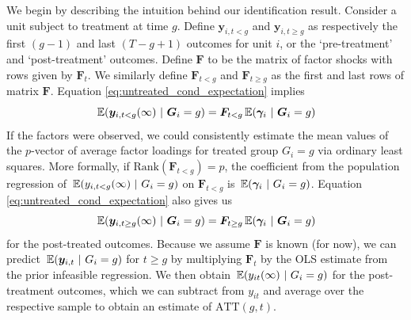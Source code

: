 \documentclass[12pt]{article}
\begin{document}
We begin by describing the intuition behind our identification result. Consider a unit subject to treatment at time $g$. Define $\bm y_{i,t<g}$ and $\bm y_{i,t\geq g}$ as respectively the first $(g-1)$ and last $(T-g+1)$ outcomes for unit $i$, or the `pre-treatment' and `post-treatment' outcomes. Define $\bm{F}$ to be the matrix of factor shocks with rows given by $\bm{F}_t$. We similarly define $\bm{F}_{t < g}$ and $\bm{F}_{t \geq g}$ as the first and last rows of matrix $\bm{F}$. Equation \eqref{eq:untreated_cond_expectation} implies
\begin{equation}
  \expec{\bm y_{i,t < g}(\infty)}{ \bm G_i = g} = \bm{F}_{t < g} \expec{\bm \gamma_i}{\bm G_i = g}
\end{equation}
If the factors were observed, we could consistently estimate the mean values of the $p$-vector of average factor loadings for treated group $G_i = g$ via ordinary least squares. More formally, if $\text{Rank}(\bm{F}_{t < g}) = p$, the coefficient from the population regression of $\expec{y_{i,t < g}(\infty) }{ G_i = g}$ on $\bm{F}_{t < g}$ is $\expec{\bm \gamma_i}{G_i = g}$. Equation \eqref{eq:untreated_cond_expectation} also gives us 
\begin{equation}
  \expec{\bm y_{i,t \geq g}(\infty)}{ \bm G_i = g} = \bm{F}_{t \geq g} \expec{\bm \gamma_i}{\bm G_i = g}
\end{equation}
for the post-treated outcomes. Because we assume $\bm{F}$ is known (for now), we can predict $\expec{\bm y_{i,t}}{G_i = g}$ for $t \geq g$ by multiplying $\bm{F}_t$  by the OLS estimate from the prior infeasible regression. We then obtain $\expec{y_{it}(\infty)}{G_i = g}$ for the post-treatment outcomes, which we can subtract from $y_{i t}$ and average over the respective sample to obtain an estimate of $\text{ATT}(g,t)$. 
\end{document}
